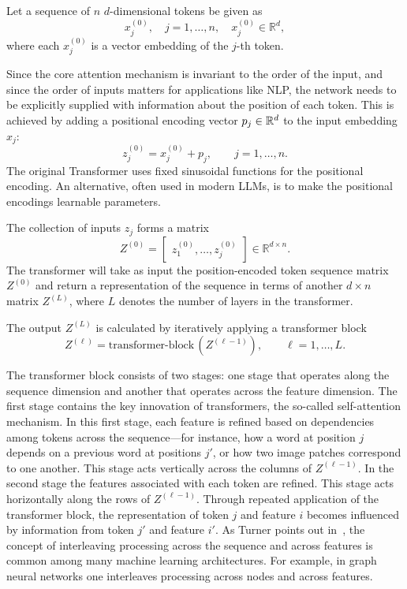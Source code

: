 Let a sequence of $n$ $d$-dimensional tokens be given as
$$
x_j^{(0)}, \quad j=1,\dots, n, \quad x_j^{(0)} \in \mathbb{R}^d,
$$
where each $x_j^{(0)}$ is a vector embedding of the $j$-th token.


Since the core attention mechanism is invariant to the order of the input, and since the order of inputs matters for applications like NLP, 
the network needs to be explicitly supplied with information about the position of each token. This is achieved by adding a positional encoding vector $p_j \in \mathbb{R}^d$ to the input embedding $x_j$:
\begin{equation}\label{positionencoding}
    z_j^{(0)} = x_j^{(0)} + p_j, \qquad j=1,\dots,n.
\end{equation}
The original Transformer uses fixed sinusoidal functions for the positional encoding. An alternative, often used in modern LLMs, is to make the positional encodings learnable parameters.

The collection of inputs $z_j$ forms a matrix
$$
Z^{(0)} = \begin{bmatrix} z_1^{(0)}, \dots , z_j^{(0)} \end{bmatrix} \in \mathbb{R}^{d \times n}.
$$
The transformer will take as input the position-encoded token sequence matrix $Z^{(0)}$ and return a representation of the sequence in terms of another $d \times n$ matrix $Z^{(L)}$, where $L$ denotes the number of layers in the
transformer.

The output $Z^{(L)}$ is calculated by iteratively applying
a transformer block
$$
Z^{(\ell)} = \text{transformer-block}\,(Z^{(\ell-1)}), \qquad \ell=1,\dots,L.$$


The transformer block consists of two stages: one stage that operates along the sequence dimension and another that operates across the feature dimension.
The first stage contains the key innovation of transformers, the so-called self-attention mechanism. 
In this first stage, each feature is refined based on dependencies among tokens across the sequence---for instance, how a word at position $j$ depends on a previous word at positions $j'$, or how two image patches correspond to one another. This stage acts vertically across the columns of $Z^{(\ell-1)}$. In the second stage the features associated with each token are refined. This stage acts horizontally along the rows of $Z^{(\ell-1)}$. Through repeated application of the transformer block, the representation of token $j$ and feature $i$ becomes influenced by information from token $j'$ and feature $i'$. As Turner points out in~\cite{turner2023introduction}, the concept of interleaving processing across the sequence and across features is common among many machine learning architectures. For example, in
graph neural networks one interleaves processing
across nodes and across features.

